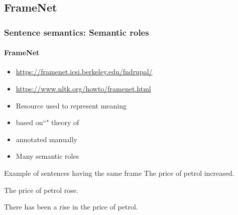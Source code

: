 \documentclass[xcolor=table]{beamer}
\begin{document}
\subsection{FrameNet}

\begin{frame}
\frametitle{Sentence semantics: Semantic roles}
\framesubtitle{FrameNet}

\begin{minipage}{.68\textwidth}
	\begin{itemize}
		\item {\scriptsize \url{https://framenet.icsi.berkeley.edu/fndrupal/}}
		\item {\scriptsize \url{https://www.nltk.org/howto/framenet.html}}
		\item Resource used to represent meaning
		\item based on``" theory of 
		\item annotated manually
		\item Many semantic roles
	\end{itemize}
\end{minipage}
\begin{minipage}{.3\textwidth}
\end{minipage}

\begin{exampleblock}{Example of sentences having the same frame}
	The price of petrol increased.
	
	The price of petrol rose.
	
	There has been a rise in the price of petrol.
\end{exampleblock}

	
\end{frame}
\end{document}
